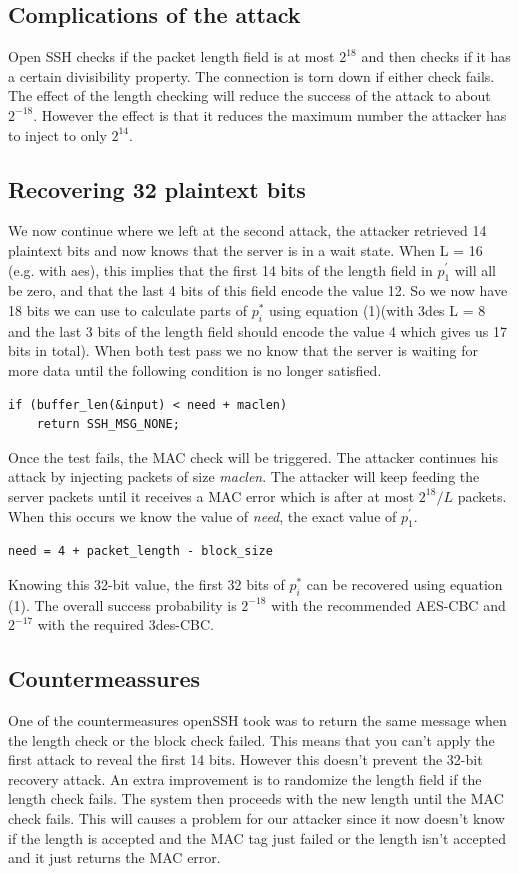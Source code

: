 \documentclass[twocolumn]{article}
\begin{document}
\subsection*{Complications of the attack}
Open SSH checks if the packet length field is at most $2^{18}$ and then checks if it has a certain divisibility property. The connection is torn down if either check fails. The effect of the length checking will reduce the success of the attack to about $2^{-18}$. However the effect is that it reduces the maximum number the attacker has to inject to only $2^{14}$.


\subsection*{Recovering 32 plaintext bits}
We now continue where we left at the second attack, the attacker retrieved 14 plaintext bits and now knows that the server is in a wait state. When L = 16 (e.g. with aes), this implies that the first 14 bits of the length field in $p^{'}_1$ will all be zero, and that the last 4 bits of this field encode the value 12. So we now have 18 bits we can use to calculate parts of $p^*_i$ using equation (1)(with 3des L = 8 and the last 3 bits of the length field should encode the value 4 which gives us 17 bits in total). When both test pass we no know that the server is waiting for more data until the following condition is no longer satisfied.
\begin{verbatim}
if (buffer_len(&input) < need + maclen)
	return SSH_MSG_NONE;
\end{verbatim}
Once the test fails, the MAC check will be triggered. The attacker continues his attack by injecting packets of size \emph{maclen}. The attacker will keep feeding the server packets until it receives a MAC error which is after at most $2^{18}/L$ packets. When this occurs we know the value of \emph{need}, the exact value of $p_1^{'}$.
\begin{verbatim}
need = 4 + packet_length - block_size
\end{verbatim}
Knowing this 32-bit value, the first 32 bits of $p^*_i$ can be recovered using equation (1).
The overall success probability is $2^{-18}$ with the recommended AES-CBC and $2^{-17}$ with the required 3des-CBC.

\subsection*{Countermeassures}
One of the countermeasures openSSH took was to return the same message when the length check or the block check failed. This means that you can't apply the first attack to reveal the first 14 bits. However this doesn't prevent the 32-bit recovery attack. An extra improvement is to randomize the length field if the length check fails. The system then proceeds with the new length until the MAC check fails. This will causes a problem for our attacker since it now doesn't know if the length is accepted and the MAC tag just failed or the length isn't accepted and it just returns the MAC error.


\end{document}
